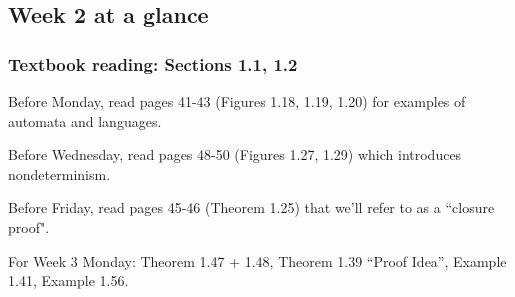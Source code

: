 \documentclass[12pt, oneside]{article}
\begin{document}
\begin{flushright}
\end{flushright} 
\subsection*{Week 2 at a glance}

\vspace{-15pt}

\subsubsection*{Textbook reading: Sections 1.1, 1.2}

\vspace{-15pt}

Before Monday, read pages 41-43 (Figures 1.18, 1.19, 1.20) for examples of automata and languages.

Before Wednesday, read pages 48-50 (Figures 1.27, 1.29) which introduces nondeterminism.

Before Friday, read pages 45-46 (Theorem 1.25) that we'll refer to as a ``closure proof".

For Week 3 Monday: Theorem 1.47 + 1.48, Theorem 1.39 ``Proof Idea'', Example 1.41, Example 1.56.

\vspace{-20pt}
\end{document}
